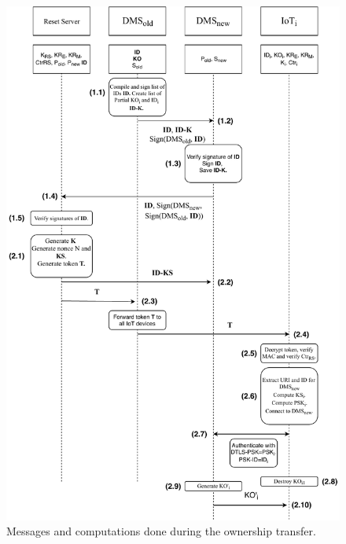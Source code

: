 {\begin{figure}[h]
\centering
\includegraphics[scale=0.545]{papers/ot/images/ot-proto-2.pdf}
\caption{Messages and computations done during the ownership transfer.}
\label{fig:proto-2}
\end{figure}

}
